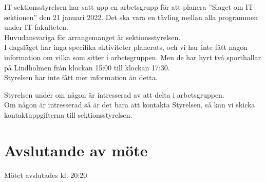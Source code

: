 \documentclass[protokoll]{dvd}
\begin{document}
IT-sektionsstyrelsen har satt upp en arbetsgrupp för att planera ''Slaget om IT-sektionen'' den 21 januari 2022.
Det ska vara en tävling mellan alla programmen under IT-fakulteten. \\
Huvudansvariga för arrangemanget är sektionsstyrelsen. \\
I dagsläget har inga specifika aktiviteter planerats, och vi har inte fått någon information om vilka som sitter i arbetsgruppen.
Men de har hyrt två sporthallar på Lindholmen från klockan 15:00 till klockan 17:30. \\
Styrelsen har inte fått mer information än detta.

Styrelsen under om någon är intresserad av att delta i arbetsgruppen. \\
Om någon är intresserad så är det bara att kontakta Styrelsen, så kan vi skicka kontaktuppgifterna till sektionsstyrelsen.

\newpage

\section{Avslutande av möte}

Mötet avslutades kl. 20:20

\end{document}
